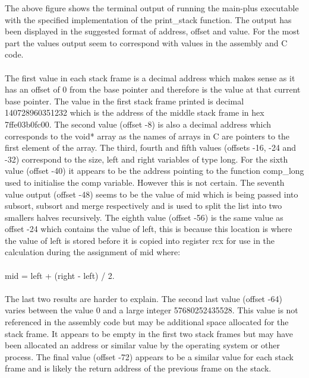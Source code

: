 \documentclass[11]{article}
\begin{document}
			The above figure shows the terminal output of running the main-plus executable with the specified implementation of the print\_stack function. The output has been displayed in the suggested format of address, offset and value. For the most part the values output seem to correspond with values in the assembly and C code.\\\\ The first value in each stack frame is a decimal address which makes sense as it has an offset of 0 from the base pointer and therefore is the value at that current base pointer. The value in the first stack frame printed is decimal 140728960351232 which is the address of the middle stack frame in hex 7ffe03b0fc00. The second value (offset -8) is also a decimal address which corresponds to the void* array as the names of arrays in C are pointers to the first element of the array. The third, fourth and fifth values (offsets -16, -24 and -32) correspond to the size, left and right variables of type long. For the sixth value (offset -40) it appears to be the address pointing to the function comp\_long used to initialise the comp variable. However this is not certain. The seventh value output (offset -48) seems to be the value of mid which is being passed into subsort, subsort and merge respectively and is used to split the list into two smallers halves recursively. The eighth value (offset -56) is the same value as offset -24 which contains the value of left, this is because this location is where the value of left is stored before it is copied into register rcx for use in the calculation during the assignment of mid where: \\\\mid = left + (right - left) / 2. \\\\ The last two results are harder to explain. The second last value (offset -64) varies between the value 0 and a large integer 57680252435528. This value is not referenced in the assembly code but may be additional space allocated for the stack frame. It appears to be empty in the first two stack frames but may have been allocated an address or similar value by the operating system or other process. The final value (offset -72) appears to be a similar value for each stack frame and is likely the return address of the previous frame on the stack.
\end{document}
